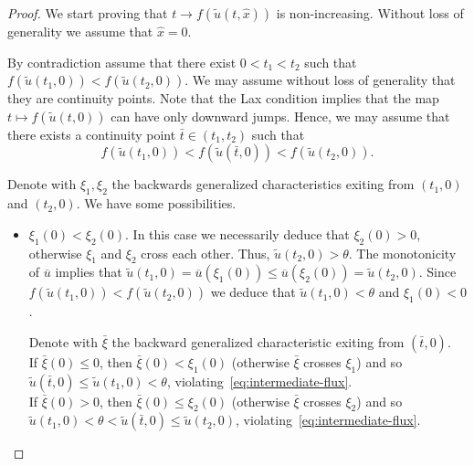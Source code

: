 \documentclass[10pt,a4paper]{amsart}
\begin{document}
\begin{proof}
We start proving that $t\to f(\widetilde u(t, \hat x))$ is non-increasing.   Without loss of generality we assume 
that $\hat{x} = 0$.

  By contradiction assume that there exist $0 < t_1 < t_2$ such that
  $f(\widetilde{u}(t_1, 0)) < f(\widetilde{u}(t_2, 0))$. We may assume without loss of generality that they are continuity points. 
  Note that the Lax condition implies that the map $t \mapsto f(\widetilde{u}(t, 0))$
  can have only downward jumps. Hence, we may assume that there exists  a continuity point $\bar t \in (t_1, t_2)$ such that 
      \begin{equation}
        \label{eq:intermediate-flux}
        f(\widetilde{u}(t_1, 0)) < f(\widetilde{u}(\bar t, 0)) < f(\widetilde{u}(t_2, 0)). 
      \end{equation}
 
  
  Denote with $\xi_1, \xi_2$ the backwards generalized characteristics exiting from
  $(t_1, 0)$ and $(t_2, 0)$. We have some possibilities.
  \begin{itemize}
      \item[(i)] $\xi_1(0) < \xi_2(0)$. In this case we necessarily deduce that $\xi_2(0) > 0$, otherwise
      $\xi_1$ and $\xi_2$ cross each other. Thus, $\widetilde{u}(t_2, 0) > \theta$.
      The monotonicity of $\overline u$ implies that
      $\widetilde{u}(t_1, 0) = \overline u(\xi_1(0)) \le \overline u(\xi_2(0)) = \widetilde{u}(t_2, 0)$.
      Since $f(\widetilde{u}(t_1, 0)) < f(\widetilde{u}(t_2, 0))$ we deduce that
      $\widetilde{u}(t_1, 0) < \theta$ and $\xi_1(0) < 0$.

      
      Denote with $\bar \xi$ the backward generalized characteristic exiting from $(\bar t, 0)$.\\
      If $\bar \xi(0) \le 0$, then $\bar \xi(0) < \xi_1(0)$ (otherwise $\bar \xi$ crosses $\xi_1$)
      and so $\widetilde{u}(\bar t, 0) \le \widetilde{u}(t_1, 0)<\theta $, 
      violating~\eqref{eq:intermediate-flux}.\\
      If $\bar \xi(0) > 0$, then $\bar \xi(0) \le \xi_2(0)$ (otherwise $\bar \xi$ crosses $\xi_2$)
      and so $\widetilde{u}(t_1, 0) < \theta < \widetilde{u}(\bar t, 0) \le \widetilde{u}(t_2, 0)$, 
      violating~\eqref{eq:intermediate-flux}.


\end{itemize}
\end{proof}
\end{document}
